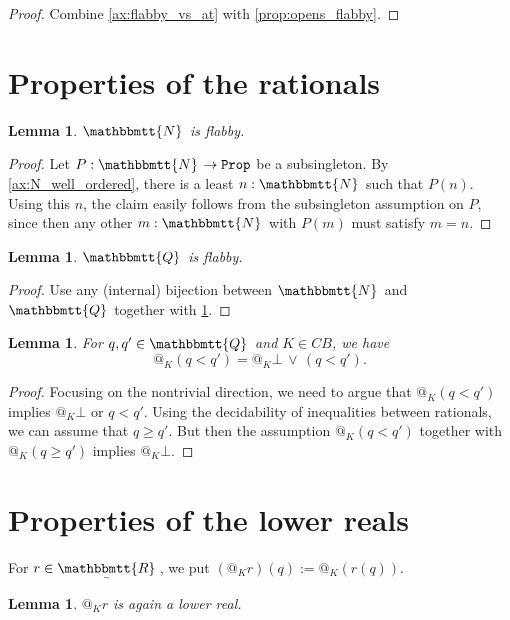 \documentclass[11pt, oneside, article]{memoir}
\makeatletter
\theoremstyle{plain}
\newtheorem{lemma}[theorem]{Lemma}
\theoremstyle{definition}
\theoremstyle{remark}
\newcommand{\const}[1]{\mathtt{#1}}
\newcommand{\ubar}[1]{\underaccent{\bar}{#1}}
\newcommand{\internal}[1]{\raisebox{-.03ex}{$\mathbbmtt{#1}$}}
\newcommand{\hs}{\hspace{1.1pt}}
\newcommand{\tNN}{\internal{N}\hs}
\newcommand{\tQQ}{\internal{Q}\hs}
\newcommand{\tRR}{\internal{R}\hs}
\newcommand{\tLR}{\ubar{\tRR}\hs}
\newcommand{\Prop}{\const{Prop}}
\newcommand{\BaseSpace}{B}
\newcommand{\CB}{C\BaseSpace}
\newcommand{\AtSymbol}{{@}}
\newcommand{\At}[2][]{\AtSymbol^{#1}_{#2}}
\makeatother
\begin{document}
\begin{proof}
	Combine \cref{ax:flabby_vs_at} with \cref{prop:opens_flabby}.	
\end{proof}

\section{Properties of the rationals}

\begin{lemma}
	$\tNN$ is flabby.
	\label{lem:N_flabby}
\end{lemma}

\begin{proof}
	Let $P : \tNN \to \Prop$ be a subsingleton. By \cref{ax:N_well_ordered}, there is a least $n : \tNN$ such that $P(n)$. Using this $n$, the claim easily follows from the subsingleton assumption on $P$, since then any other $m:\tNN$ with $P(m)$ must satisfy $m = n$.
\end{proof}

\begin{lemma}
	$\tQQ$ is flabby.
	\label{lem:Q_flabby}
\end{lemma}

\begin{proof}
	Use any (internal) bijection between $\tNN$ and $\tQQ$ together with \cref{lem:N_flabby}.
\end{proof}

\begin{lemma}
	\label{lem:rational_compare_at}
	For $q,q'\in\tQQ$ and $K\in\CB$, we have
	\[
		\At{K}(q < q') = \At{K}\bot \, \lor \, (q < q').
	\]
\end{lemma}

\begin{proof}
	Focusing on the nontrivial direction, we need to argue that $\At{K}(q < q')$ implies $\At{K}\bot$ or $q < q'$. Using the decidability of inequalities between rationals, we can assume that $q \geq q'$. But then the assumption $\At{K}(q < q')$ together with $\At{K}(q \geq q')$ implies $\At{K}\bot$.
\end{proof}

\section{Properties of the lower reals}

For $r\in\tLR$, we put $(\At{K}r)(q) := \At{K}(r(q))$.

\begin{lemma}
	$\At{K}r$ is again a lower real.	
\end{lemma}
\end{document}

